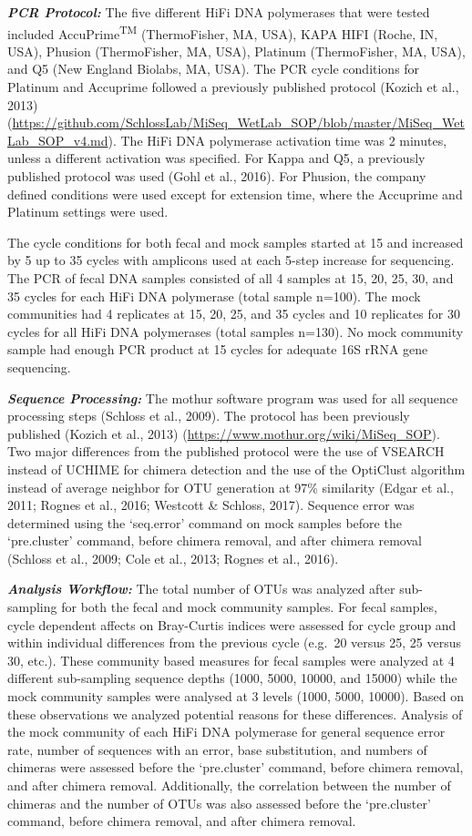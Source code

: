 \documentclass[12pt,]{article}
\begin{document}
\textbf{\emph{PCR Protocol:}} The five different HiFi DNA polymerases
that were tested included AccuPrime\textsuperscript{TM} (ThermoFisher,
MA, USA), KAPA HIFI (Roche, IN, USA), Phusion (ThermoFisher, MA, USA),
Platinum (ThermoFisher, MA, USA), and Q5 (New England Biolabs, MA, USA).
The PCR cycle conditions for Platinum and Accuprime followed a
previously published protocol (Kozich et al., 2013)
(\url{https://github.com/SchlossLab/MiSeq_WetLab_SOP/blob/master/MiSeq_WetLab_SOP_v4.md}).
The HiFi DNA polymerase activation time was 2 minutes, unless a
different activation was specified. For Kappa and Q5, a previously
published protocol was used (Gohl et al., 2016). For Phusion, the
company defined conditions were used except for extension time, where
the Accuprime and Platinum settings were used.

The cycle conditions for both fecal and mock samples started at 15 and
increased by 5 up to 35 cycles with amplicons used at each 5-step
increase for sequencing. The PCR of fecal DNA samples consisted of all 4
samples at 15, 20, 25, 30, and 35 cycles for each HiFi DNA polymerase
(total sample n=100). The mock communities had 4 replicates at 15, 20,
25, and 35 cycles and 10 replicates for 30 cycles for all HiFi DNA
polymerases (total samples n=130). No mock community sample had enough
PCR product at 15 cycles for adequate 16S rRNA gene sequencing.

\textbf{\emph{Sequence Processing:}} The mothur software program was
used for all sequence processing steps (Schloss et al., 2009). The
protocol has been previously published (Kozich et al., 2013)
(\url{https://www.mothur.org/wiki/MiSeq_SOP}). Two major differences
from the published protocol were the use of VSEARCH instead of UCHIME
for chimera detection and the use of the OptiClust algorithm instead of
average neighbor for OTU generation at 97\% similarity (Edgar et al.,
2011; Rognes et al., 2016; Westcott \& Schloss, 2017). Sequence error
was determined using the `seq.error' command on mock samples before the
`pre.cluster' command, before chimera removal, and after chimera removal
(Schloss et al., 2009; Cole et al., 2013; Rognes et al., 2016).

\textbf{\emph{Analysis Workflow:}} The total number of OTUs was analyzed
after sub-sampling for both the fecal and mock community samples. For
fecal samples, cycle dependent affects on Bray-Curtis indices were
assessed for cycle group and within individual differences from the
previous cycle (e.g.~20 versus 25, 25 versus 30, etc.). These community
based measures for fecal samples were analyzed at 4 different
sub-sampling sequence depths (1000, 5000, 10000, and 15000) while the
mock community samples were analysed at 3 levels (1000, 5000, 10000).
Based on these observations we analyzed potential reasons for these
differences. Analysis of the mock community of each HiFi DNA polymerase
for general sequence error rate, number of sequences with an error, base
substitution, and numbers of chimeras were assessed before the
`pre.cluster' command, before chimera removal, and after chimera
removal. Additionally, the correlation between the number of chimeras
and the number of OTUs was also assessed before the `pre.cluster'
command, before chimera removal, and after chimera removal.
\end{document}
